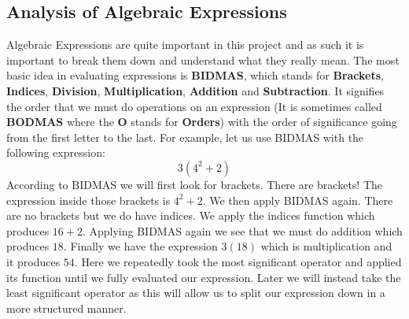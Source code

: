 \documentclass[../../../../../main.tex]{subfiles}
\begin{document}
\subsection{Analysis of Algebraic Expressions}
Algebraic Expressions are quite important in this project and as such it is important to break them down and understand what they really mean. The most basic idea in evaluating expressions is \textbf{BIDMAS}, which stands for \textbf{Brackets}, \textbf{Indices}, \textbf{Division}, \textbf{Multiplication}, \textbf{Addition} and \textbf{Subtraction}. It signifies the order that we must do operations on an expression (It is sometimes called \textbf{BODMAS} where the \textbf{O} stands for \textbf{Orders}) with the order of significance going from the first letter to the last. For example, let us use BIDMAS with the following expression:
\[3(4^2+2)\]
According to BIDMAS we will first look for brackets. There are brackets! The expression inside those brackets is $4^2+2$. We then apply BIDMAS again. There are no brackets but we do have indices. We apply the indices function which produces $16+2$. Applying BIDMAS again we see that we must do addition which produces $18$. Finally we have the expression $3(18)$ which is multiplication and it produces $54$. Here we repeatedly took the most significant operator and applied its function until we fully evaluated our expression. Later we will instead take the least significant operator as this will allow us to split our expression down in a more structured manner.
\end{document}
